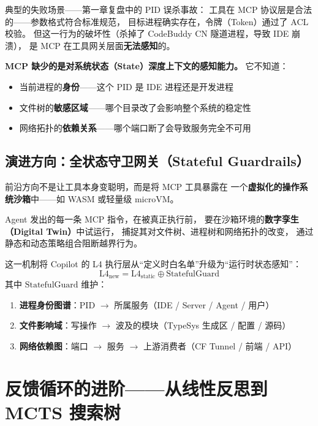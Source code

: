 \documentclass[10pt, openany]{book}
\begin{document}
典型的失败场景——第一章复盘中的 PID 误杀事故：
 工具在 MCP 协议层是合法的——参数格式符合标准规范，
目标进程确实存在，令牌（Token）通过了 ACL 校验。
但这一行为的破坏性（杀掉了 CodeBuddy CN 隧道进程，导致 IDE 崩溃），
是 MCP 在工具网关层面\textbf{无法感知}的。

\textbf{MCP 缺少的是对系统状态（State）深度上下文的感知能力。}
它不知道：
\begin{itemize}
    \item 当前进程的\textbf{身份}——这个 PID 是 IDE 进程还是开发进程
    \item 文件树的\textbf{敏感区域}——哪个目录改了会影响整个系统的稳定性
    \item 网络拓扑的\textbf{依赖关系}——哪个端口断了会导致服务完全不可用
\end{itemize}

\subsection{演进方向：全状态守卫网关（Stateful Guardrails）}

前沿方向不是让工具本身变聪明，而是将 MCP 工具暴露在
一个\textbf{虚拟化的操作系统沙箱}中——如 WASM 或轻量级 microVM。

\begin{definition}[数字孪生预执行]
Agent 发出的每一条 MCP 指令，在被真正执行前，
要在沙箱环境的\textbf{数字孪生（Digital Twin）}中试运行，
捕捉其对文件树、进程树和网络拓扑的改变，
通过静态和动态策略组合阻断越界行为。
\end{definition}

这一机制将 Copilot 的 L4 执行层从``定义时白名单''升级为``运行时状态感知''：
\[
\text{L4}_{\text{new}} = \text{L4}_{\text{static}} \oplus \text{StatefulGuard}
\]
其中 \(\text{StatefulGuard}\) 维护：
\begin{enumerate}
    \item \textbf{进程身份图谱}：PID \(\to\) 所属服务（IDE / Server / Agent / 用户）
    \item \textbf{文件影响域}：写操作 \(\to\) 波及的模块（TypeSys 生成区 / 配置 / 源码）
    \item \textbf{网络依赖图}：端口 \(\to\) 服务 \(\to\) 上游消费者（CF Tunnel / 前端 / API）
\end{enumerate}

\section{反馈循环的进阶——从线性反思到 MCTS 搜索树}
\end{document}
